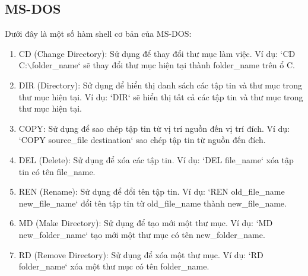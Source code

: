 \documentclass[12pt,a4paper]{article}
\begin{document}
\subsection{MS-DOS}
Dưới đây là một số hàm shell cơ bản của MS-DOS:
\begin{enumerate}
	\item CD (Change Directory): Sử dụng để thay đổi thư mục làm việc. Ví dụ: `CD C:$\backslash$folder\_name` sẽ thay đổi thư mục hiện tại thành folder\_name trên ổ C.
	\item DIR (Directory): Sử dụng để hiển thị danh sách các tập tin và thư mục trong thư mục hiện tại. Ví dụ: `DIR` sẽ hiển thị tất cả các tập tin và thư mục trong thư mục hiện tại.
	\item COPY: Sử dụng để sao chép tập tin từ vị trí nguồn đến vị trí đích. Ví dụ: `COPY source\_file destination` sao chép tập tin từ nguồn đến đích.
	\item DEL (Delete): Sử dụng để xóa các tập tin. Ví dụ: `DEL file\_name` xóa tập tin có tên file\_name.
	\item REN (Rename): Sử dụng để đổi tên tập tin. Ví dụ: `REN old\_file\_name new\_file\_name` đổi tên tập tin từ old\_file\_name thành new\_file\_name.
	\item MD (Make Directory): Sử dụng để tạo mới một thư mục. Ví dụ: `MD new\_folder\_name` tạo mới một thư mục có tên new\_folder\_name.
	\item RD (Remove Directory): Sử dụng để xóa một thư mục. Ví dụ: `RD folder\_name` xóa một thư mục có tên folder\_name.
\end{enumerate}
\end{document}
